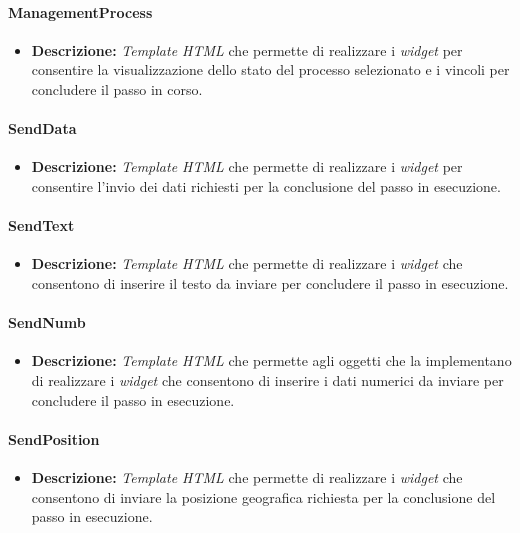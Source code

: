 \paragraph{ManagementProcess}
\begin{itemize}
\item \textbf{Descrizione:} \textit{Template HTML} che permette di realizzare i \textit{widget} per consentire la visualizzazione dello stato del processo selezionato e i vincoli per concludere il passo in corso.
\end{itemize}

\paragraph{SendData}
\begin{itemize}
\item \textbf{Descrizione:} \textit{Template HTML} che permette di realizzare i \textit{widget} per consentire l'invio dei dati richiesti per la conclusione del passo in esecuzione.
\end{itemize}

\paragraph{SendText}
\begin{itemize}
\item \textbf{Descrizione:} \textit{Template HTML} che permette di realizzare i \textit{widget} che consentono di inserire il testo da inviare per concludere il passo in esecuzione.
\end{itemize}

\paragraph{SendNumb}
\begin{itemize}
\item \textbf{Descrizione:} \textit{Template HTML} che permette agli oggetti che la implementano di realizzare i \textit{widget} che consentono di inserire i dati numerici da inviare per concludere il passo in esecuzione.
\end{itemize}

\paragraph{SendPosition}
\begin{itemize}
\item \textbf{Descrizione:} \textit{Template HTML} che permette  di realizzare i \textit{widget} che consentono di inviare la posizione geografica richiesta per la conclusione del passo in esecuzione.
\end{itemize}

